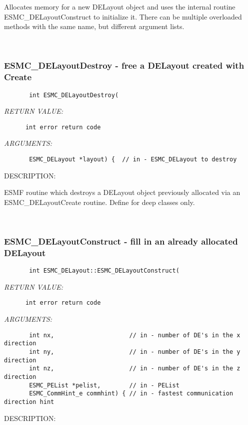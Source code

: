         Allocates memory for a new DELayout
        object and uses the internal routine ESMC\_DELayoutConstruct to
        initialize it. There can be multiple overloaded methods with the 
        same name, but different argument lists.
   
 
\mbox{}\hrulefill\ 
 
\subsubsection{ESMC\_DELayoutDestroy - free a DELayout created with Create}


  
\begin{verbatim}       int ESMC_DELayoutDestroy(\end{verbatim}{\em RETURN VALUE:}
\begin{verbatim}      int error return code\end{verbatim}{\em ARGUMENTS:}
\begin{verbatim}       ESMC_DELayout *layout) {  // in - ESMC_DELayout to destroy\end{verbatim}
{\sf DESCRIPTION:\\ }


        ESMF routine which destroys a DELayout object previously allocated
        via an ESMC\_DELayoutCreate routine.  Define for deep classes only.
   
 
\mbox{}\hrulefill\ 
 
\subsubsection{ESMC\_DELayoutConstruct - fill in an already allocated DELayout}


  
\begin{verbatim}       int ESMC_DELayout::ESMC_DELayoutConstruct(\end{verbatim}{\em RETURN VALUE:}
\begin{verbatim}      int error return code\end{verbatim}{\em ARGUMENTS:}
\begin{verbatim}       int nx,                     // in - number of DE's in the x direction
       int ny,                     // in - number of DE's in the y direction
       int nz,                     // in - number of DE's in the z direction
       ESMC_PEList *pelist,        // in - PEList
       ESMC_CommHint_e commhint) { // in - fastest communication direction hint\end{verbatim}
{\sf DESCRIPTION:\\ }


